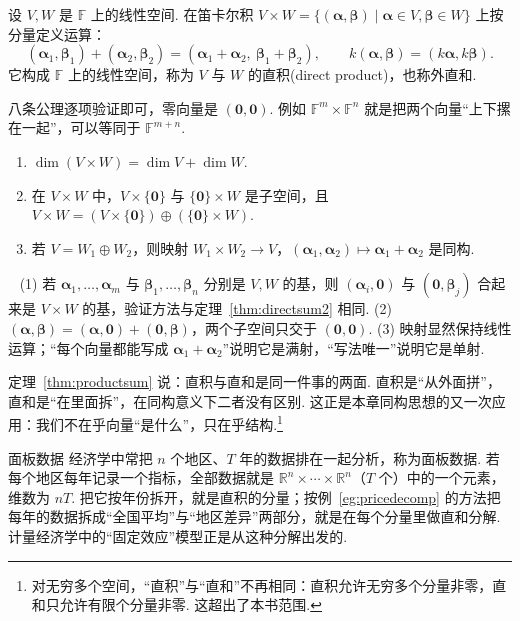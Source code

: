 \documentclass[lang=cn,10.5pt,scheme=chinese,toc=twocol,section,chinesefont=nofont,
twoside,citestyle=gb7714-2015,bibstyle=gb7714-2015]{elegantbook}
\DeclareRobustCommand{\textbf}[1]{{\lnsemiboldlatin\lnsemiboldcjk #1}}
\newcommand{\vv}[1]{\boldsymbol{#1}}
\newcommand{\zero}{\boldsymbol{0}}          %
\numberwithin{equation}{section}   %
\newcommand*{\lnlabel}[1]{{\sffamily\bfseries\color{black}#1}}
\renewenvironment{proof}{%
	\par\noindent\lnlabel{\proofname}\;\ \color{black!90}\cfs}{\par}
\begin{document}
\begin{definition}
  设 $V,W$ 是 $\mathbb{F}$ 上的线性空间. 在笛卡尔积 $V\times W=\{(\vv\alpha,\vv\beta)\mid\vv\alpha\in V,\vv\beta\in W\}$ 上按分量定义运算：
  \[(\vv\alpha_1,\vv\beta_1)+(\vv\alpha_2,\vv\beta_2)=(\vv\alpha_1+\vv\alpha_2,\ \vv\beta_1+\vv\beta_2),\qquad k(\vv\alpha,\vv\beta)=(k\vv\alpha,k\vv\beta).\]
  它构成 $\mathbb{F}$ 上的线性空间，称为 $V$ 与 $W$ 的\textbf{直积}(direct product)，也称\textbf{外直和}.
\end{definition}

八条公理逐项验证即可，零向量是 $(\zero,\zero)$. 例如 $\mathbb{F}^m\times\mathbb{F}^n$ 就是把两个向量“上下摞在一起”，可以等同于 $\mathbb{F}^{m+n}$.

\begin{theorem}
  \label{thm:productsum}
  \begin{enumerate}
    \item $\dim(V\times W)=\dim V+\dim W$.
    \item 在 $V\times W$ 中，$V\times\{\zero\}$ 与 $\{\zero\}\times W$ 是子空间，且 $V\times W=(V\times\{\zero\})\oplus(\{\zero\}\times W)$.
    \item 若 $V=W_1\oplus W_2$，则映射 $W_1\times W_2\to V$，$(\vv\alpha_1,\vv\alpha_2)\mapsto\vv\alpha_1+\vv\alpha_2$ 是同构.
  \end{enumerate}
\end{theorem}
\begin{proof}
  (1) 若 $\vv\alpha_1,\ldots,\vv\alpha_m$ 与 $\vv\beta_1,\ldots,\vv\beta_n$ 分别是 $V,W$ 的基，则 $(\vv\alpha_i,\zero)$ 与 $(\zero,\vv\beta_j)$ 合起来是 $V\times W$ 的基，验证方法与定理~\ref{thm:directsum2} 相同. (2) $(\vv\alpha,\vv\beta)=(\vv\alpha,\zero)+(\zero,\vv\beta)$，两个子空间只交于 $(\zero,\zero)$. (3) 映射显然保持线性运算；“每个向量都能写成 $\vv\alpha_1+\vv\alpha_2$”说明它是满射，“写法唯一”说明它是单射.
\end{proof}

\begin{motivebox}
  定理~\ref{thm:productsum} 说：\textbf{直积与直和是同一件事的两面}. 直积是“从外面拼”，直和是“在里面拆”，在同构意义下二者没有区别. 这正是本章同构思想的又一次应用：我们不在乎向量“是什么”，只在乎结构.\footnote{对无穷多个空间，“直积”与“直和”不再相同：直积允许无穷多个分量非零，直和只允许有限个分量非零. 这超出了本书范围.}
\end{motivebox}

\begin{linkbox}{面板数据}
  经济学中常把 $n$ 个地区、$T$ 年的数据排在一起分析，称为\textbf{面板数据}. 若每个地区每年记录一个指标，全部数据就是 $\mathbb{R}^n\times\cdots\times\mathbb{R}^n$（$T$ 个）中的一个元素，维数为 $nT$. 把它按年份拆开，就是直积的分量；按例~\ref{eg:pricedecomp} 的方法把每年的数据拆成“全国平均”与“地区差异”两部分，就是在每个分量里做直和分解. 计量经济学中的“固定效应”模型正是从这种分解出发的.
\end{linkbox}
\end{document}
